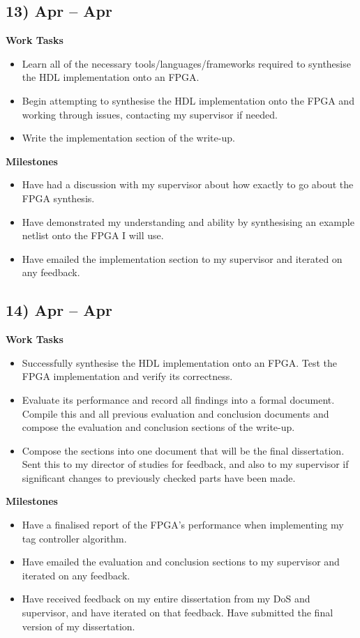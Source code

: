 \documentclass[10pt,a4paper]{article}
\begin{document}
\subsection*{13)  Apr --  Apr}
\textbf{Work Tasks}
\begin{itemize}
	\item Learn all of the necessary tools/languages/frameworks required to synthesise the HDL implementation onto an FPGA.
	\item Begin attempting to synthesise the HDL implementation onto the FPGA and working through issues, contacting my supervisor if needed.
	\item Write the implementation section of the write-up.
\end{itemize}

\textbf{Milestones}
\begin{itemize}
	\item Have had a discussion with my supervisor about how exactly to go about the FPGA synthesis.
	\item Have demonstrated my understanding and ability by synthesising an example netlist onto the FPGA I will use.
	\item Have emailed the implementation section to my supervisor and iterated on any feedback.
\end{itemize}

\subsection*{14)  Apr --  Apr}
\textbf{Work Tasks}
\begin{itemize}
	\item Successfully synthesise the HDL implementation onto an FPGA. Test the FPGA implementation and verify its correctness.
	\item Evaluate its performance and record all findings into a formal document. Compile this and all previous evaluation and conclusion documents and compose the evaluation and conclusion sections of the write-up.
	\item Compose the sections into one document that will be the final dissertation. Sent this to my director of studies for feedback, and also to my supervisor if significant changes to previously checked parts have been made.
\end{itemize}

\textbf{Milestones}
\begin{itemize}
	\item Have a finalised report of the FPGA's performance when implementing my tag controller algorithm.
	\item Have emailed the evaluation and conclusion sections to my supervisor and iterated on any feedback.
	\item Have received feedback on my entire dissertation from my DoS and supervisor, and have iterated on that feedback. Have submitted the final version of my dissertation.
\end{itemize}
\end{document}
